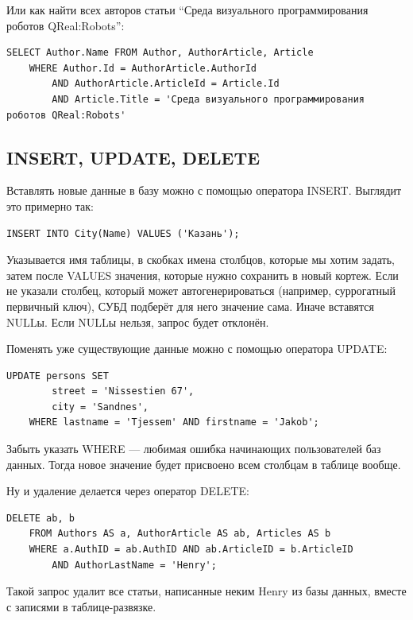 \documentclass[a5paper]{article}
\begin{document}
Или как найти всех авторов статьи ``Среда визуального программирования роботов QReal:Robots'':

\begin{verbatim}
SELECT Author.Name FROM Author, AuthorArticle, Article 
    WHERE Author.Id = AuthorArticle.AuthorId 
        AND AuthorArticle.ArticleId = Article.Id 
        AND Article.Title = 'Среда визуального программирования роботов QReal:Robots'
\end{verbatim}

\subsection{INSERT, UPDATE, DELETE}

Вставлять новые данные в базу можно с помощью оператора INSERT. Выглядит это примерно так:

\begin{verbatim}
INSERT INTO City(Name) VALUES ('Казань');
\end{verbatim}

Указывается имя таблицы, в скобках имена столбцов, которые мы хотим задать, затем после VALUES значения, которые нужно сохранить в новый кортеж. Если не указали столбец, который может автогенерироваться (например, суррогатный первичный ключ), СУБД подберёт для него значение сама. Иначе вставятся NULLы. Если NULLы нельзя, запрос будет отклонён.

Поменять уже существующие данные можно с помощью оператора UPDATE:

\begin{verbatim}
UPDATE persons SET
        street = 'Nissestien 67',
        city = 'Sandnes',
    WHERE lastname = 'Tjessem' AND firstname = 'Jakob';
\end{verbatim}

Забыть указать WHERE --- любимая ошибка начинающих пользователей баз данных. Тогда новое значение будет присвоено всем столбцам в таблице вообще.

Ну и удаление делается через оператор DELETE:

\begin{verbatim}
DELETE ab, b
    FROM Authors AS a, AuthorArticle AS ab, Articles AS b
    WHERE a.AuthID = ab.AuthID AND ab.ArticleID = b.ArticleID
        AND AuthorLastName = 'Henry';
\end{verbatim}

Такой запрос удалит все статьи, написанные неким Henry из базы данных, вместе с записями в таблице-развязке.
\end{document}
